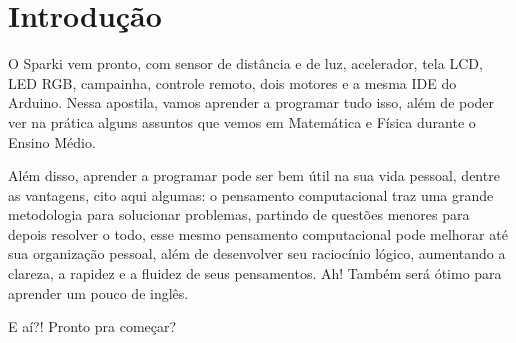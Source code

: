 \documentclass[conference]{IEEEtran}
\begin{document}
\section{\textbf{Introdução}}
    O Sparki vem pronto, com sensor de distância e de luz, acelerador, tela LCD, LED RGB, campainha, controle remoto, dois motores e a mesma IDE do Arduino. Nessa apostila, vamos aprender a programar tudo isso, além de poder ver na prática alguns assuntos que vemos em Matemática e Física durante o Ensino Médio.
    \par 
    Além disso, aprender a programar pode ser bem útil na sua vida pessoal, dentre as vantagens, cito aqui algumas: o pensamento computacional traz uma grande metodologia para solucionar problemas, partindo de questões menores para depois resolver o todo, esse mesmo pensamento computacional pode melhorar até sua organização pessoal, além de desenvolver seu raciocínio lógico, aumentando a clareza, a rapidez e a fluidez de seus pensamentos. Ah! Também será ótimo para aprender um pouco de inglês.
    \par
    E aí?! Pronto pra começar?
\end{document}
